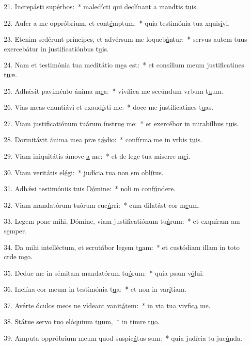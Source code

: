 21. Increpásti sup\uline{é}rbos:~* maledícti qui declínant a mandtis t\uline{u}is.\par 
22. Aufer a me oppróbrium, et cont\uline{é}mptum:~* quia testimónia tua xquis\uline{í}vi.\par 
23. Etenim sedérunt príncipes, et advérsum me loqueb\uline{á}ntur:~* servus autem tuus exercebátur in justificatiónbus t\uline{u}is.\par 
24. Nam et testimónia tua meditátio m\uline{e}a est:~* et consílium meum justificatines t\uline{u}æ.\par 
25. Adhǽsit paviménto ánima m\uline{e}a:~* vivífica me secúndum vrbum t\uline{u}um.\par 
26. Vias meas enuntiávi et exaud\uline{í}sti me:~* doce me justificatines t\uline{u}as.\par 
27. Viam justificatiónum tuárum ínstru\uline{e} me:~* et exercébor in mirabílbus t\uline{u}is.\par 
28. Dormitávit ánima mea præ t\uline{ǽ}dio:~* confírma me in vrbis t\uline{u}is.\par 
29. Viam iniquitátis ámove \uline{a} me:~* et de lege tua miserre m\uline{e}i.\par 
30. Viam veritátis el\uline{é}gi:~* judícia tua non sm obl\uline{í}tus.\par 
31. Adhǽsi testimóniis tuis D\uline{ó}mine:~* noli m conf\uline{ú}ndere.\par 
32. Viam mandatórum tuórum cuc\uline{ú}rri:~* cum dilatást cor m\uline{e}um.\par 
33. Legem pone mihi, Dómine, viam justificatiónum tu\uline{á}rum:~* et exquíram am s\uline{e}mper.\par 
34. Da mihi intelléctum, et scrutábor legem t\uline{u}am:~* et custódiam illam in toto crde m\uline{e}o.\par 
35. Deduc me in sémitam mandatórum tu\uline{ó}rum:~* quia psam v\uline{ó}lui.\par 
36. Inclína cor meum in testimónia t\uline{u}a:~* et non in var\uline{í}tiam.\par 
37. Avérte óculos meos ne vídeant vanit\uline{á}tem:~* in via tua vivfic\uline{a} me.\par 
38. Státue servo tuo elóquium t\uline{u}um,~* in timre t\uline{u}o.\par 
39. Amputa oppróbrium meum quod suspic\uline{á}tus sum:~* quia judícia tu juc\uline{ú}nda.\par 
